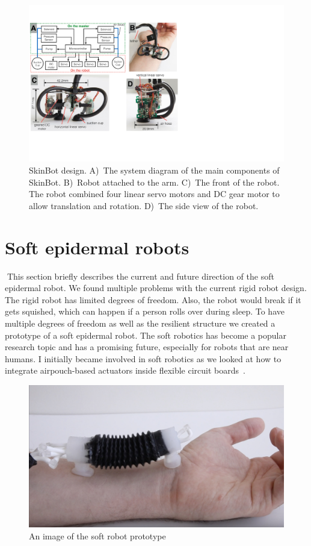 \begin{figure}[!t]
\centering
\includegraphics[width=12.0cm]{pictures/chapter3/robot_design.pdf}
\caption{SkinBot design. A)~The system diagram of the main components of SkinBot. B)~Robot attached to the arm. C)~The front of the robot. The robot combined four linear servo motors and DC gear motor to allow translation and rotation. D)~The side view of the robot.}
\label{fig:system_diagram}
\end{figure}


\section{Soft epidermal robots}
This section briefly describes the current and future direction of the soft epidermal robot. We found multiple problems with the current rigid robot design. The rigid robot has limited degrees of freedom. Also, the robot would break if it gets squished, which can happen if a person rolls over during sleep. To have multiple degrees of freedom as well as the resilient structure we created a prototype of a soft epidermal robot. The soft robotics has become a popular research topic and has a promising future, especially for robots that are near humans. I initially became involved in soft robotics as we looked at how to integrate airpouch-based actuators inside flexible circuit boards~\cite{dementyev2018mass}. 

\begin{figure}[!t]
\centering
\includegraphics[width=12.0cm]{pictures/chapter3/soft_robot.jpg}
\caption{An image of the soft robot prototype}
\label{fig:system_diagram}
\end{figure}


